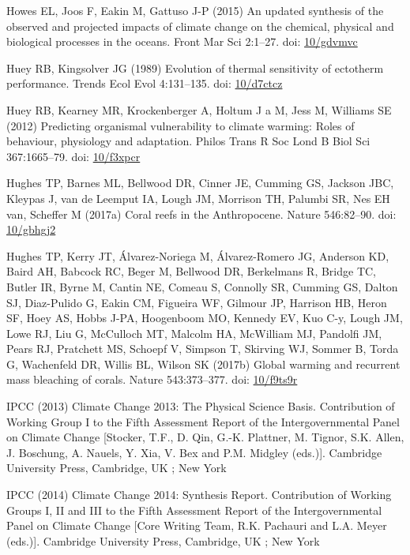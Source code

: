 \documentclass[a4paper,10pt, oneside]{memoir}
\begin{document}
\leavevmode\hypertarget{ref-Howes2015}{}%
Howes EL, Joos F, Eakin M, Gattuso J-P (2015) An updated synthesis of the observed and projected impacts of climate change on the chemical, physical and biological processes in the oceans. Front Mar Sci 2:1--27. doi: \href{https://doi.org/10/gdvmvc}{10/gdvmvc}

\leavevmode\hypertarget{ref-Huey1989}{}%
Huey RB, Kingsolver JG (1989) Evolution of thermal sensitivity of ectotherm performance. Trends Ecol Evol 4:131--135. doi: \href{https://doi.org/10/d7ctcz}{10/d7ctcz}

\leavevmode\hypertarget{ref-Huey2012}{}%
Huey RB, Kearney MR, Krockenberger A, Holtum J a M, Jess M, Williams SE (2012) Predicting organismal vulnerability to climate warming: Roles of behaviour, physiology and adaptation. Philos Trans R Soc Lond B Biol Sci 367:1665--79. doi: \href{https://doi.org/10/f3xpcr}{10/f3xpcr}

\leavevmode\hypertarget{ref-Hughes2017}{}%
Hughes TP, Barnes ML, Bellwood DR, Cinner JE, Cumming GS, Jackson JBC, Kleypas J, van de Leemput IA, Lough JM, Morrison TH, Palumbi SR, Nes EH van, Scheffer M (2017a) Coral reefs in the Anthropocene. Nature 546:82--90. doi: \href{https://doi.org/10/gbhgj2}{10/gbhgj2}

\leavevmode\hypertarget{ref-Hughes2017a}{}%
Hughes TP, Kerry JT, Álvarez-Noriega M, Álvarez-Romero JG, Anderson KD, Baird AH, Babcock RC, Beger M, Bellwood DR, Berkelmans R, Bridge TC, Butler IR, Byrne M, Cantin NE, Comeau S, Connolly SR, Cumming GS, Dalton SJ, Diaz-Pulido G, Eakin CM, Figueira WF, Gilmour JP, Harrison HB, Heron SF, Hoey AS, Hobbs J-PA, Hoogenboom MO, Kennedy EV, Kuo C-y, Lough JM, Lowe RJ, Liu G, McCulloch MT, Malcolm HA, McWilliam MJ, Pandolfi JM, Pears RJ, Pratchett MS, Schoepf V, Simpson T, Skirving WJ, Sommer B, Torda G, Wachenfeld DR, Willis BL, Wilson SK (2017b) Global warming and recurrent mass bleaching of corals. Nature 543:373--377. doi: \href{https://doi.org/10/f9ts9r}{10/f9ts9r}

\leavevmode\hypertarget{ref-IPCC2013}{}%
IPCC (2013) Climate Change 2013: The Physical Science Basis. Contribution of Working Group I to the Fifth Assessment Report of the Intergovernmental Panel on Climate Change {[}Stocker, T.F., D. Qin, G.-K. Plattner, M. Tignor, S.K. Allen, J. Boschung, A. Nauels, Y. Xia, V. Bex and P.M. Midgley (eds.){]}. Cambridge University Press, Cambridge, UK ; New York

\leavevmode\hypertarget{ref-IPCC2014}{}%
IPCC (2014) Climate Change 2014: Synthesis Report. Contribution of Working Groups I, II and III to the Fifth Assessment Report of the Intergovernmental Panel on Climate Change {[}Core Writing Team, R.K. Pachauri and L.A. Meyer (eds.){]}. Cambridge University Press, Cambridge, UK ; New York
\end{document}
